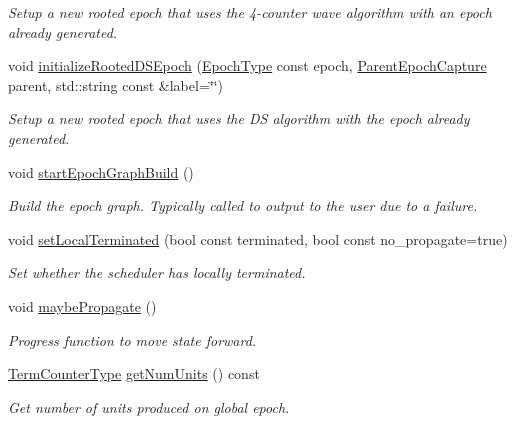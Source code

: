 \begin{DoxyCompactItemize}
\begin{DoxyCompactList}\small\item\em Setup a new rooted epoch that uses the 4-\/counter wave algorithm with an epoch already generated. \end{DoxyCompactList}\item 
void \hyperlink{structvt_1_1term_1_1_termination_detector_abde094c3bca75435fb56ef3eb5e6512c}{initialize\+Rooted\+D\+S\+Epoch} (\hyperlink{namespacevt_a985a5adf291c34a3ca263b3378388236}{Epoch\+Type} const epoch, \hyperlink{structvt_1_1term_1_1_parent_epoch_capture}{Parent\+Epoch\+Capture} parent, std\+::string const \&label=\char`\"{}\char`\"{})
\begin{DoxyCompactList}\small\item\em Setup a new rooted epoch that uses the DS algorithm with the epoch already generated. \end{DoxyCompactList}\item 
void \hyperlink{structvt_1_1term_1_1_termination_detector_a782a54afd99943982ce455416828ea66}{start\+Epoch\+Graph\+Build} ()
\begin{DoxyCompactList}\small\item\em Build the epoch graph. Typically called to output to the user due to a failure. \end{DoxyCompactList}\item 
void \hyperlink{structvt_1_1term_1_1_termination_detector_acb639c048af01c8d67c82db0227888a4}{set\+Local\+Terminated} (bool const terminated, bool const no\+\_\+propagate=true)
\begin{DoxyCompactList}\small\item\em Set whether the scheduler has locally terminated. \end{DoxyCompactList}\item 
void \hyperlink{structvt_1_1term_1_1_termination_detector_a4a54157fff0152b531b26c4a18393049}{maybe\+Propagate} ()
\begin{DoxyCompactList}\small\item\em Progress function to move state forward. \end{DoxyCompactList}\item 
\hyperlink{namespacevt_1_1term_a4fd378cdb0c36683afc1b3399d685f7f}{Term\+Counter\+Type} \hyperlink{structvt_1_1term_1_1_termination_detector_aa5802cb6f199f3359b1a85058102220c}{get\+Num\+Units} () const
\begin{DoxyCompactList}\small\item\em Get number of units produced on global epoch. \end{DoxyCompactList}\item 

\end{DoxyCompactItemize}
